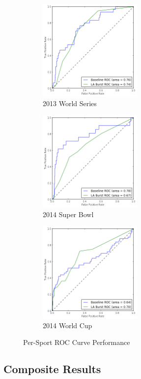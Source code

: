 \documentclass{sig-alternate}
\begin{document}
\begin{figure}
\centering
\begin{subfigure}[b]{0.3\textwidth}
\includegraphics[width=2in]{./figures/roc_2013_WorldSeries.png}
\caption{2013 World Series}
\label{fig:roc2013WorldSeries}
\end{subfigure}
\begin{subfigure}[b]{0.3\textwidth}
\includegraphics[width=2in]{./figures/roc_2014_SuperBowl.png}
\caption{2014 Super Bowl}
\label{fig:roc2014SuperBowl}
\end{subfigure}
\begin{subfigure}[b]{0.3\textwidth}
\includegraphics[width=2in]{./figures/roc_2014_WorldCup.png}
\caption{2014 World Cup}
\label{fig:roc2014WorldCup}
\end{subfigure}
\caption{Per-Sport ROC Curve Performance}
\label{fig:joinedPerf}
\end{figure}

\subsection{Composite Results}
\end{document}
